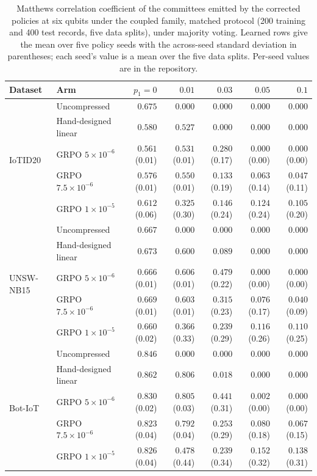 \begin{table}[t]
\centering
\footnotesize
\setlength{\tabcolsep}{2.5pt}
\caption{Matthews correlation coefficient of the committees emitted by the corrected policies at
six qubits under the coupled family, matched protocol (200 training and 400 test records, five data splits),
under majority voting.
Learned rows give the mean over five policy seeds with the across-seed standard deviation in
parentheses; each seed's value is a mean over the five data splits.
Per-seed values are in the repository.}
\label{tab:compdownstream}
\begin{tabular}{@{}llrrrrr@{}}
\toprule
Dataset & Arm & $p_1 = 0$ & $0.01$ & $0.03$ & $0.05$ & $0.1$ \\
\midrule
\multirow{5}{*}{IoTID20}
 & Uncompressed & $0.675$ & $0.000$ & $0.000$ & $0.000$ & $0.000$ \\
 & Hand-designed linear & $0.580$ & $0.527$ & $0.000$ & $0.000$ & $0.000$ \\
 & GRPO $5\times10^{-6}$ & $0.561$ (0.01) & $0.531$ (0.01) & $0.280$ (0.17) & $0.000$ (0.00) & $0.000$ (0.00) \\
 & GRPO $7.5\times10^{-6}$ & $0.576$ (0.01) & $0.550$ (0.01) & $0.133$ (0.19) & $0.063$ (0.14) & $0.047$ (0.11) \\
 & GRPO $1\times10^{-5}$ & $0.612$ (0.06) & $0.325$ (0.30) & $0.146$ (0.24) & $0.124$ (0.24) & $0.105$ (0.20) \\
\midrule
\multirow{5}{*}{UNSW-NB15}
 & Uncompressed & $0.667$ & $0.000$ & $0.000$ & $0.000$ & $0.000$ \\
 & Hand-designed linear & $0.673$ & $0.600$ & $0.089$ & $0.000$ & $0.000$ \\
 & GRPO $5\times10^{-6}$ & $0.666$ (0.01) & $0.606$ (0.01) & $0.479$ (0.22) & $0.000$ (0.00) & $0.000$ (0.00) \\
 & GRPO $7.5\times10^{-6}$ & $0.669$ (0.01) & $0.603$ (0.01) & $0.315$ (0.23) & $0.076$ (0.17) & $0.040$ (0.09) \\
 & GRPO $1\times10^{-5}$ & $0.660$ (0.02) & $0.366$ (0.33) & $0.239$ (0.29) & $0.116$ (0.26) & $0.110$ (0.25) \\
\midrule
\multirow{5}{*}{Bot-IoT}
 & Uncompressed & $0.846$ & $0.000$ & $0.000$ & $0.000$ & $0.000$ \\
 & Hand-designed linear & $0.862$ & $0.806$ & $0.018$ & $0.000$ & $0.000$ \\
 & GRPO $5\times10^{-6}$ & $0.830$ (0.02) & $0.805$ (0.03) & $0.441$ (0.31) & $0.002$ (0.00) & $0.000$ (0.00) \\
 & GRPO $7.5\times10^{-6}$ & $0.823$ (0.04) & $0.792$ (0.04) & $0.253$ (0.29) & $0.080$ (0.18) & $0.067$ (0.15) \\
 & GRPO $1\times10^{-5}$ & $0.826$ (0.04) & $0.478$ (0.44) & $0.239$ (0.34) & $0.152$ (0.32) & $0.138$ (0.31) \\
\bottomrule
\end{tabular}
\end{table}
